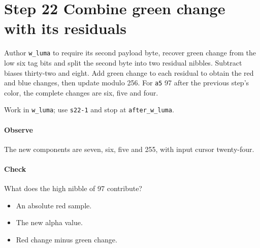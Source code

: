 \section{Step 22 Combine green change with its residuals}\label{qoi-s22}
Author \texttt{w\_luma} to require its second payload byte, recover green change from the low six tag bits and split the second byte into two residual nibbles. Subtract biases thirty-two and eight. Add green change to each residual to obtain the red and blue changes, then update modulo 256. For \texttt{a5} 97 after the previous step’s color, the complete changes are six, five and four.

Work in \texttt{w\_luma}; use \texttt{s22-1} and stop at \texttt{after\_w\_luma}.

\paragraph{Observe} The new components are seven, six, five and 255, with input cursor twenty-four.

\paragraph{Check} What does the high nibble of 97 contribute?
\begin{itemize}
  \item[A.] An absolute red sample.
  \item[B.] The new alpha value.
  \item[C.] Red change minus green change.
\end{itemize}
